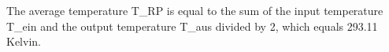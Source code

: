 The average temperature T_RP is equal to the sum of the input temperature T_ein and the output temperature T_aus divided by 2, which equals 293.11 Kelvin.
